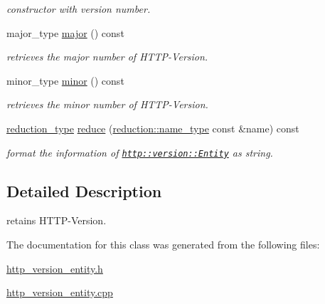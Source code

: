 \begin{DoxyCompactItemize}
\begin{DoxyCompactList}\small\item\em constructor with version number. \end{DoxyCompactList}\item 
\hypertarget{classhryky_1_1http_1_1version_1_1_entity_ac64b377083289ff986525ddba6f8d96b}{major\-\_\-type \hyperlink{classhryky_1_1http_1_1version_1_1_entity_ac64b377083289ff986525ddba6f8d96b}{major} () const }\label{classhryky_1_1http_1_1version_1_1_entity_ac64b377083289ff986525ddba6f8d96b}

\begin{DoxyCompactList}\small\item\em retrieves the major number of H\-T\-T\-P-\/\-Version. \end{DoxyCompactList}\item 
\hypertarget{classhryky_1_1http_1_1version_1_1_entity_acdc34bd9d3ceac4971d12058cba3b336}{minor\-\_\-type \hyperlink{classhryky_1_1http_1_1version_1_1_entity_acdc34bd9d3ceac4971d12058cba3b336}{minor} () const }\label{classhryky_1_1http_1_1version_1_1_entity_acdc34bd9d3ceac4971d12058cba3b336}

\begin{DoxyCompactList}\small\item\em retrieves the minor number of H\-T\-T\-P-\/\-Version. \end{DoxyCompactList}\item 
\hypertarget{classhryky_1_1http_1_1version_1_1_entity_ad42fcba159117f025b3b9b34c367fdf5}{\hyperlink{namespacehryky_a343a9a4c36a586be5c2693156200eadc}{reduction\-\_\-type} \hyperlink{classhryky_1_1http_1_1version_1_1_entity_ad42fcba159117f025b3b9b34c367fdf5}{reduce} (\hyperlink{namespacehryky_1_1reduction_ac686c30a4c8d196bbd0f05629a6b921f}{reduction\-::name\-\_\-type} const \&name) const }\label{classhryky_1_1http_1_1version_1_1_entity_ad42fcba159117f025b3b9b34c367fdf5}

\begin{DoxyCompactList}\small\item\em format the information of \href{http::version::Entity}{\tt http\-::version\-::\-Entity} as string. \end{DoxyCompactList}\end{DoxyCompactItemize}


\subsection{Detailed Description}
retains H\-T\-T\-P-\/\-Version. 

The documentation for this class was generated from the following files\-:\begin{DoxyCompactItemize}
\item 
\hyperlink{http__version__entity_8h}{http\-\_\-version\-\_\-entity.\-h}\item 
\hyperlink{http__version__entity_8cpp}{http\-\_\-version\-\_\-entity.\-cpp}\end{DoxyCompactItemize}
